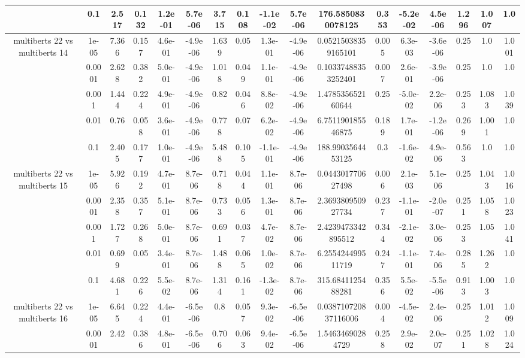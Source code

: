\begin{tabular}{|c|c|c|c|c|c|c|c|c|c|c|c|c|c|c|c|c|}
 & 0.1 & 2.517 & 0.132 & 1.2e-01 & 5.7e-06 & 3.715 & 0.108 & -1.1e-02 & 5.7e-06 & 176.5850830078125 & 0.353 & -5.2e-02 & 4.5e-06 & 1.296 & 1.007 & 1.0 \\
\hline
\multirow{5}{*}{multiberts 22 vs multiberts 14} & 1e-05 & 7.366 & 0.157 & 4.6e-01 & -4.9e-06 & 1.639 & 0.05 & 1.3e-01 & -4.9e-06 & 0.05215038359165101 & 0.005 & 6.3e-03 & -3.6e-06 & 0.25 & 1.0 & 1.001 \\
 & 0.0001 & 2.628 & 0.382 & 5.0e-01 & -4.9e-06 & 1.018 & 0.049 & 1.1e-01 & -4.9e-06 & 0.10337488353252401 & 0.007 & 2.6e-01 & -3.9e-06 & 0.25 & 1.0 & 1.0 \\
 & 0.001 & 1.444 & 0.224 & 4.9e-01 & -4.9e-06 & 0.82 & 0.046 & 8.8e-02 & -4.9e-06 & 1.478535652160644 & 0.25 & -5.0e-02 & 2.2e-06 & 0.253 & 1.083 & 1.039 \\
 & 0.01 & 0.76 & 0.058 & 3.6e-01 & -4.9e-06 & 0.778 & 0.07 & 6.2e-02 & -4.9e-06 & 6.751190185546875 & 0.189 & 1.7e-01 & -1.2e-06 & 0.269 & 1.001 & 1.0 \\
 & 0.1 & 2.405 & 0.177 & 1.0e-01 & -4.9e-06 & 5.488 & 0.105 & -1.1e-01 & -4.9e-06 & 188.9903564453125 & 0.3 & -1.6e-02 & 4.9e-06 & 0.563 & 1.0 & 1.0 \\
\hline
\multirow{5}{*}{multiberts 22 vs multiberts 15} & 1e-05 & 5.926 & 0.192 & 4.7e-01 & 8.7e-06 & 0.718 & 0.044 & 1.1e-01 & 8.7e-06 & 0.044301770627498 & 0.006 & 2.1e-03 & 5.1e-06 & 0.25 & 1.043 & 1.016 \\
 & 0.0001 & 2.358 & 0.357 & 5.1e-01 & 8.7e-06 & 0.733 & 0.056 & 1.3e-01 & 8.7e-06 & 2.369380950927734 & 0.237 & -1.1e-01 & -2.0e-07 & 0.251 & 1.058 & 1.023 \\
 & 0.001 & 1.727 & 0.268 & 5.0e-01 & 8.7e-06 & 0.691 & 0.037 & 4.7e-02 & 8.7e-06 & 2.4239473342895512 & 0.344 & -2.1e-02 & 3.0e-06 & 0.253 & 1.05 & 1.041 \\
 & 0.01 & 0.699 & 0.05 & 3.4e-01 & 8.7e-06 & 1.488 & 0.065 & 1.0e-02 & 8.7e-06 & 6.255424499511719 & 0.247 & -1.1e-01 & 7.4e-06 & 0.285 & 1.262 & 1.0 \\
 & 0.1 & 4.681 & 0.226 & 5.5e-02 & 8.7e-06 & 1.314 & 0.161 & -1.3e-02 & 8.7e-06 & 315.6841125488281 & 0.356 & 5.5e-02 & -5.5e-06 & 0.913 & 1.003 & 1.0 \\
\hline
\multirow{5}{*}{multiberts 22 vs multiberts 16} & 1e-05 & 6.645 & 0.224 & 4.4e-01 & -6.5e-06 & 0.8 & 0.057 & 9.3e-02 & -6.5e-06 & 0.038710720837116006 & 0.004 & -4.5e-02 & 2.4e-06 & 0.25 & 1.012 & 1.009 \\
 & 0.0001 & 2.42 & 0.386 & 4.8e-01 & -6.5e-06 & 0.706 & 0.063 & 9.4e-02 & -6.5e-06 & 1.54634690284729 & 0.258 & 2.9e-02 & 2.0e-07 & 0.251 & 1.028 & 1.024 \\

\end{tabular}
